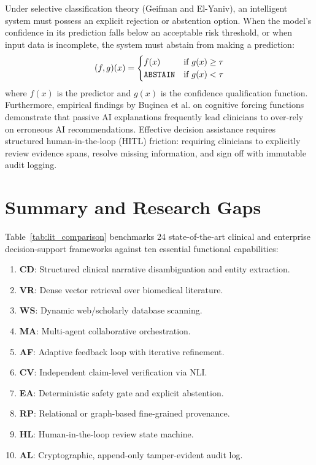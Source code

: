 \documentclass[12pt,a4paper]{report}
\begin{document}
Under selective classification theory (Geifman and El-Yaniv), an intelligent system must possess an explicit rejection or abstention option. When the model's confidence in its prediction falls below an acceptable risk threshold, or when input data is incomplete, the system must abstain from making a prediction:
\begin{equation}
    (f, g)(x) = \begin{cases} 
        f(x) & \text{if } g(x) \ge \tau \\ 
        \text{\texttt{ABSTAIN}} & \text{if } g(x) < \tau 
    \end{cases}
\end{equation}
where $f(x)$ is the predictor and $g(x)$ is the confidence qualification function. Furthermore, empirical findings by Bu\c{c}inca et al. on cognitive forcing functions demonstrate that passive AI explanations frequently lead clinicians to over-rely on erroneous AI recommendations. Effective decision assistance requires structured human-in-the-loop (HITL) friction: requiring clinicians to explicitly review evidence spans, resolve missing information, and sign off with immutable audit logging.

\section{Summary and Research Gaps}
Table~\ref{tab:lit_comparison} benchmarks 24 state-of-the-art clinical and enterprise decision-support frameworks against ten essential functional capabilities:
\begin{enumerate}
    \item \textbf{CD}: Structured clinical narrative disambiguation and entity extraction.
    \item \textbf{VR}: Dense vector retrieval over biomedical literature.
    \item \textbf{WS}: Dynamic web/scholarly database scanning.
    \item \textbf{MA}: Multi-agent collaborative orchestration.
    \item \textbf{AF}: Adaptive feedback loop with iterative refinement.
    \item \textbf{CV}: Independent claim-level verification via NLI.
    \item \textbf{EA}: Deterministic safety gate and explicit abstention.
    \item \textbf{RP}: Relational or graph-based fine-grained provenance.
    \item \textbf{HL}: Human-in-the-loop review state machine.
    \item \textbf{AL}: Cryptographic, append-only tamper-evident audit log.
\end{enumerate}
\end{document}
